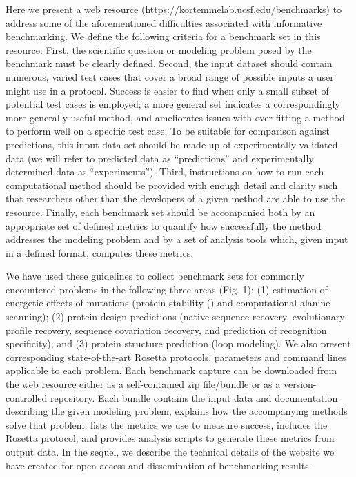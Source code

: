 Here we present a web resource (https://kortemmelab.ucsf.edu/benchmarks) to address some of the aforementioned difficulties associated with informative benchmarking. We define the following criteria for a benchmark set in this resource: First, the scientific question or modeling problem posed by the benchmark must be clearly defined. Second, the input dataset should contain numerous, varied test cases that cover a broad range of possible inputs a user might use in a protocol. Success is easier to find when only a small subset of potential test cases is employed; a more general set indicates a correspondingly more generally useful method, and ameliorates issues with over-fitting a method to perform well on a specific test case. To be suitable for comparison against predictions, this input data set should be made up of experimentally validated data (we will refer to predicted data as “predictions” and experimentally determined data as “experiments”). Third, instructions on how to run each computational method should be provided with enough detail and clarity such that researchers other than the developers of a given method are able to use the resource. Finally, each benchmark set should be accompanied both by an appropriate set of defined metrics to quantify how successfully the method addresses the modeling problem and by a set of analysis tools which, given input in a defined format, computes these metrics.

We have used these guidelines to collect benchmark sets for commonly encountered problems in the following three areas (Fig. 1): (1) estimation of energetic effects of mutations (protein stability (\ddg) and computational alanine scanning); (2) protein design predictions (native sequence recovery, evolutionary profile recovery, sequence covariation recovery, and prediction of recognition specificity); and (3) protein structure prediction (loop modeling). We also present corresponding state-of-the-art Rosetta protocols, parameters and command lines applicable to each problem. Each benchmark capture can be downloaded from the web resource either as a self-contained zip file/bundle or as a version-controlled repository. Each bundle contains the input data and documentation describing the given modeling problem, explains how the accompanying methods solve that problem, lists the metrics we use to measure success, includes the Rosetta protocol, and provides analysis scripts to generate these metrics from output data. In the sequel, we describe the technical details of the website we have created for open access and dissemination of benchmarking results.

